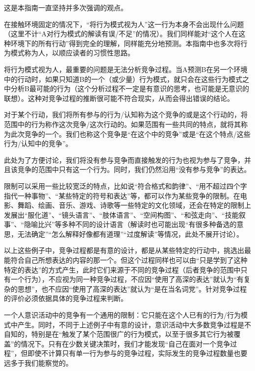 \begin{explain}
这是本指南一直坚持并多次强调的观点。

在接触环境固定的情况下，“将行为模式视为人”这一行为本身不会出现什么问题（这里不计“A对行为模式的解读有误/不足”的情况）。我们同样能对“这个人在这种环境下的所有行动”得到完全的理解，同样能充分地预测。本指南中也多次将行为模式称为人，以顺应读者的习惯性思路。

将行为模式视为人，最重要的问题是无法分析竞争过程。当A预测B在另一个环境中的行动时，如果只知道B的一个（或少量）行为模式，就只会在这些行为模式之中分析B最可能的行为（这个分析过程不一定是有意识的思考，也可能是无意识的联想）。这种对竞争过程的推断很可能不符合现实，从而会得出错误的结论。
\end{explain}

对于某个行动，我们将所有参与的行为/认知称为这个竞争的或是这个行动的，将范围中的行为称作这次竞争/这次行动的。如果范围有一些共同的特点，就将其称为此次竞争的一个。我们也称这个竞争是“在这个中的竞争”或是“在这个特点/这些行为/认知中的竞争”。
\begin{explain}
此处为了方便讨论，我们将没有参与竞争而直接触发的行为也视为参与了竞争，并且该竞争的范围中只有这一个行为。同时，我们仍然沿用“没有参与竞争”的表达。

限制可以采用一些比较宽泛的特点，比如说“符合格式和韵律”、“用不超过四个字指代一种事物”、“某些特定的符号和表达”等，都可以作为某些竞争的限制。在电影、舞蹈、绘画、音乐、游戏、诗歌等一些特定的文化领域，还会在特定的限制上发展出“服化道”、“镜头语言”、“肢体语言”、“空间构图”、“和弦走向”、“技能叙事”、“隐喻比兴”等多种不同的设计语言（解读时也可能出现“有很多种备选的意思，无法确定”“怎么解释好像都有道理”“过度解读”等情况，此处不展开讨论）。

以上这些例子中，竞争过程都是有意的设计，都是从某些特定的行动中，挑选出最能符合自己所想表达的内容的那一个。但这个过程同样也可以由“只是学到了这种特定的表达”的方式产生，此时它们来源于不同的竞争过程（后者竞争的范围中只有一个行为），不应视为同一种竞争过程，不应因“使用了高深的表达”就认为“有复杂的思想”，也不应因“使用了高深的表达”就认为“是在当名词党”。针对竞争过程的评价必须依据具体的竞争过程来判断。

一个人意识活动中的竞争有一个通用的限制：它只能在这个人已有的行为/行为模式中产生。同时，不同于上述例子中有意的设计，意识活动中大多数竞争过程是不自知的，特别是在“触发了某个范围很广的行为模式，以至于很多其它行为被覆盖”的情况下。只有在少数关键决策时，我们才能发现“自己在面对一个竞争过程”，但即使不计算只有单一行为参与的竞争过程，实际发生的竞争过程数量也要远多于我们能察觉的。
\end{explain}

